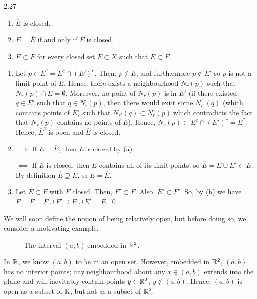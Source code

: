 \begin{theorem}{}{2.27}
    \begin{enumerate}
        \item $\overline{E}$ is closed.
        \item $E = \overline{E}$ if and only if $E$ is closed.
        \item $\overline{E} \subset F$ for every closed set $F \subset X$ such that $E \subset F$.
    \end{enumerate}
\end{theorem}
\begin{nproof}
    \begin{enumerate}
        \item Let $p \in \overline{E}^c = E^c \cap (E')^c$. Then, $p \notin E$, and furthermore $p \notin E'$ so $p$ is not a limit point of $E$. Hence, there exists a neighbourhood $N_r(p)$ such that $N_r(p) \cap E = \emptyset$. Moreover, no point of $N_r(p)$ is in $E'$ (if there existed $q \in E'$ such that $q \in N_r(p)$, then there would exist some $N_{r'}(q)$ (which contains points of $E$) such that $N_{r'}(q) \subset N_r(p)$ which contradicts the fact that $N_r(p)$ contains no points of $E$). Hence, $N_r(p) \subset E^c \cap (E')^c = \overline{E}^c$. Hence, $\overline{E}^c$ is open and $\overline{E}$ is closed.
        \item $\boxed{\implies}$ If $E = \overline{E}$, then $E$ is closed by (a).
        
        $\boxed{\impliedby}$ If $E$ is closed, then $E$ contains all of its limit points, so $\overline{E} = E \cup E' \subset E$. By definition $\overline{E} \supseteq E$, so $E = \overline{E}$. 
        \item Let $E \subset F$ with $F$ closed. Then, $F' \subset F$. Also, $E' \subset F'$. So, by (b) we have $F = \overline{F} = F \cup F' \supseteq E \cup E' = \overline{E}$. \qed
    \end{enumerate}
\end{nproof}

\noindent We will soon define the notion of being relatively open, but before doing so, we consider a motivating example.

\begin{figure}[htbp]
    \centering
    \caption{The interval $(a, b)$ embedded in $\mathbb{R}^2$.}
    \label{fig9}
\end{figure}
In $\mathbb{R}$, we know $(a, b)$ to be in an open set. However, embedded in $\mathbb{R}^2$, $(a, b)$ has no interior points; any neighbourhood about any $x \in (a, b)$ extends into the plane and will inevitably contain points $y \in \mathbb{R}^2$, $y \notin (a, b)$. Hence, $(a, b)$ is open as a subset of $\mathbb{R}$, but not as a subset of $\mathbb{R}^2$. 

